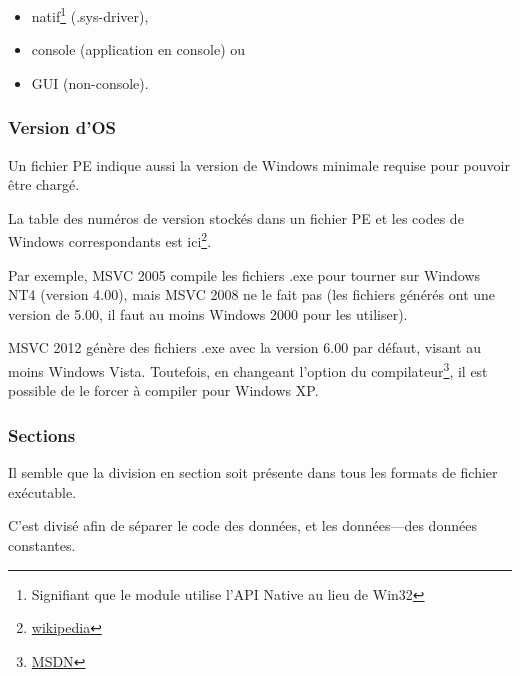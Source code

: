 
\begin{itemize}
\item natif\footnote{Signifiant que le module utilise l'API Native au lieu de Win32} (.sys-driver), 

\item console (application en console) ou

\item \ac{GUI} (non-console).
\end{itemize}

\subsubsection{Version d'OS}

Un fichier PE indique aussi la version de Windows minimale requise pour pouvoir être
chargé.

La table des numéros de version stockés dans un fichier PE et les codes de Windows
correspondants est ici\footnote{\href{http://go.yurichev.com/17044}{wikipedia}}.

Par exemple, \ac{MSVC} 2005 compile les fichiers .exe pour tourner sur Windows NT4
(version 4.00), mais \ac{MSVC} 2008 ne le fait pas (les fichiers générés ont une
version de 5.00, il faut au moins Windows 2000 pour les utiliser).


\ac{MSVC} 2012 génère des fichiers .exe avec la version 6.00 par défaut, visant au
moins Windows Vista.
Toutefois, en changeant l'option du compilateur\footnote{\href{http://go.yurichev.com/17045}{MSDN}},
il est possible de le forcer à compiler pour Windows XP.

\subsubsection{Sections}

Il semble que la division en section soit présente dans tous les formats de fichier
exécutable.

C'est divisé afin de séparer le code des données, et les données---des données constantes.

